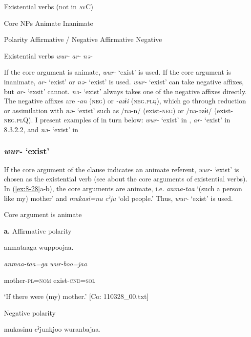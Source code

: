 \begin{table}
\caption{\label{tab:key:74}Existential verbs (not in \textsc{av}C)}

Core NPs  Animate  Inanimate

Polarity  Affirmative / Negative  Affirmative  Negative

Existential verbs  \textit{wur-}  \textit{ar-}  \textit{nə-}
\end{table}

If the core argument is animate, \textit{wur-} ‘exist’ is used. If the core argument is inanimate, \textit{ar-} ‘exist’ or \textit{nə-} ‘exist’ is used. \textit{wur-} ‘exist’ can take negative affixes, but \textit{ar-} ‘exsit’ cannot. \textit{nə-} ‘exist’ always takes one of the negative affixes directly. The negative affixes are \textit{{}-an} (\textsc{neg}) or \textit{{}-azɨi} (\textsc{neg}.\textsc{plq}), which go through reduction or assimilation with \textit{nə-} ‘exist’ such as /nə-n/ (exist-\textsc{neg}) or /nə-əzɨi/ (exist-\textsc{neg}.\textsc{pl}Q). I present examples of  in turn below: \textit{wur-} ‘exist’ in , \textit{ar-} ‘exist’ in 8.3.2.2, and \textit{nə-} ‘exist’ in 

\subsubsection{\textit{wur-} ‘exist’}

If the core argument of the clause indicates an animate referent, \textit{wur-} ‘exist’ is chosen as the existential verb (see  about the core arguments of existential verbs). In (\ref{ex:8-28}a-b), the core arguments are animate, i.e. \textit{anma-taa} ‘(such a person like my) mother’ and \textit{mukasi=nu} \textit{cˀju} ‘old people.’ Thus, \textit{wur-} ‘exist’ is used.

\textbf{\ea\label{ex:8-28}
}  Core argument is animate

  \textbf{a.}  Affirmative polarity

    {\TM}
\glll  anmataaga  wuppoojaa.

      \textit{anmaa-taa=ga}  \textit{wur{}-boo=jaa}

      mother-\textsc{pl}=\textsc{nom}  exist-\textsc{cnd}=\textsc{sol}

\glt ‘If there were (my) mother.’ [Co: 110328\_00.txt]
\z

\ex  Negative polarity

    {\TM}
\glll  mukasinu  cˀjunkjoo  wuranbajaa.

